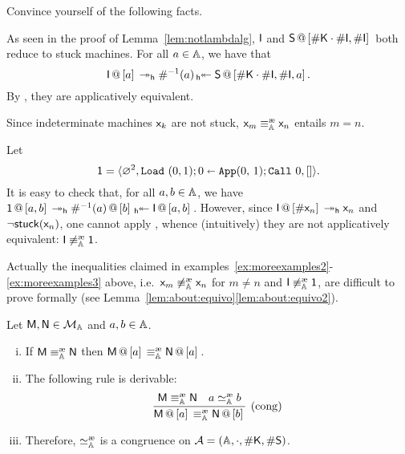 \begin{exas}\label{ex:moreexamples} Convince yourself of the following facts.
\bsub
\item\label{ex:moreexamples1}
	As seen in the proof of Lemma~\ref{lem:notlambdalg}, $\mach{I}$ and $\append{\mach{S}}{\App{\Lookup\mK}{\Lookup \mach{I}},\Lookup\mach{I}}$ both reduce to stuck machines.
	For all $a\in\Addrs$, we have that \[\append{\mach{I}}{a}\reddh\Lookinv a\invredd[\mach{h}] \append{\mach{S}}{\App{\Lookup\mK}{\Lookup\mach{I}},\Lookup\mach{I},a}.\]
	By \extrule, they are applicatively equivalent.
\item\label{ex:moreexamples2}
	Since indeterminate machines $\mach{x}_k$ are not stuck, $\mach{x}_m\equivea\mach{x}_n$ entails $m=n$.
\item\label{ex:moreexamples3}
	Let \[\mach{1} = \tuple{\Null^2,\Load (0,1);\Apply010;\Call 0,[]}.\] It is easy to check that, for all $a,b\in\Addrs$, we have $\append{\mach{1}}{a,b}\reddh \append{\Lookinv{a}}{b}\invredd[\mach{h}] \append{\mach{I}}{a,b}$. However, since   $\append{\mach{I}}{\Lookup\mach{x}_n}\reddh \mach{x}_n$ and $\lnot\stuck{\mach{x}_n}$, one cannot apply \extrule{}, whence (intuitively) they are not applicatively equivalent: $\mach{I} \not\equivea \mach{1}$.
\esub
\end{exas}

\noindent
Actually the inequalities claimed in examples~\ref{ex:moreexamples2}-\ref{ex:moreexamples3} above, i.e.\ $\mach{x}_m\not\equivea\mach{x}_n$ for $m\neq n$ and $\mach{I}\not\equivea\mach{1}$, are difficult to prove formally (see Lemma~\ref{lem:about:equivo}\ref{lem:about:equivo2}).

\begin{lem} Let $\mM,\mN\in\cM$ and $a,b\in\Addrs$.
\begin{enumerate}[(i)]
\item If $\mM\equivea \mN$ then $\append{\mM}{a}\equivea \append{\mN}{a}$.
\item The following rule is derivable:
\[
	\infer[(\mathrm{cong})]{\append{\mM}{a}\equivea \append{\mN}{b}}{\mM \equivea \mN& a \simea b}
\]
\item Therefore, $\simea$ is a congruence on $\cA = (\Addrs,\cdot,\Lookup\mK,\Lookup\mS)$.
\end{enumerate}
\end{lem}

